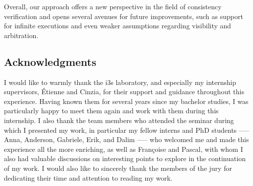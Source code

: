 \documentclass[12pt]{article}
\begin{document}
Overall, our approach offers a new perspective in the field of consistency verification and opens several avenues for future improvements, such as support for infinite executions and even weaker assumptions regarding visibility and arbitration.

\newpage

{

  \vspace*{\fill} %
  \begin{center}
  \begin{minipage}{0.8\textwidth} %
  
  \section*{Acknowledgments}
      I would like to warmly thank the i3s laboratory, and especially my internship supervisors, Étienne and Cinzia, for their support and guidance throughout this experience. Having known them for several years since my bachelor studies, I was particularly happy to meet them again and work with them during this internship. I also thank the team members who attended the seminar during which I presented my work, in particular my fellow interns and PhD students —-- Anna, Anderson, Gabriele, Erik, and Dalim —-- who welcomed me and made this experience all the more enriching, as well as Françoise and Pascal, with whom I also had valuable discussions on interesting points to explore in the continuation of my work. I would also like to sincerely thank the members of the jury for dedicating their time and attention to reading my work.
      \end{minipage}
  \end{center}
    
  
  \vspace*{\fill} %
}

%
\end{document}
